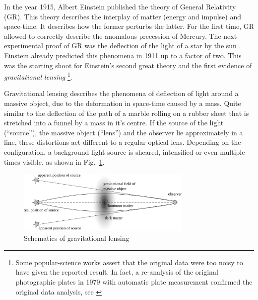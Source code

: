 \documentclass[11pt]{article}
\begin{document}
In the year 1915, Albert Einstein published the theory of General Relativity (GR).
This theory describes the interplay of matter (energy and impulse) and space-time: It describes how the former perturbs the latter.
For the first time, GR allowed to correctly describe the anomalous precession of Mercury.
The next experimental proof of GR was the deflection of the light of a star by the sun \cite{1920RSPTA.220..291D}.
Einstein already predicted this phenomena in 1911 up to a factor of two.
This was the starting shoot for Einstein’s second great theory and the first evidence of \emph{gravitational lensing}
\footnote{Some popular-science works assert that the original data were
        too noisy to have given the reported result.  In fact, a
        re-analysis of the original photographic plates in 1979 with
        automatic plate measurement confirmed the original data
        analysis, see \cite{kennefick2009testing}}.

Gravitational lensing describes the phenomena of deflection of light around a massive object, due to the deformation in space-time caused by a mass.
Quite similar to the deflection of the path of a marble rolling on a rubber sheet that is stretched into a funnel by a mass in it's centre.
If the source of the light (``source''), the massive object (``lens'') and the observer lie approximately in a line, these distortions act different to a regular optical lens.
Depending on the configuration, a background light source is sheared, intensified or even multiple times visible, as shown in Fig.~\ref{fig:grav_lens}.

\begin{figure}[ht]
	\centering
		\includegraphics[width=0.75\textwidth]{img/grav_lens}
	\caption{Schematics of gravitational lensing}
	\label{fig:grav_lens}
\end{figure}
\end{document}
